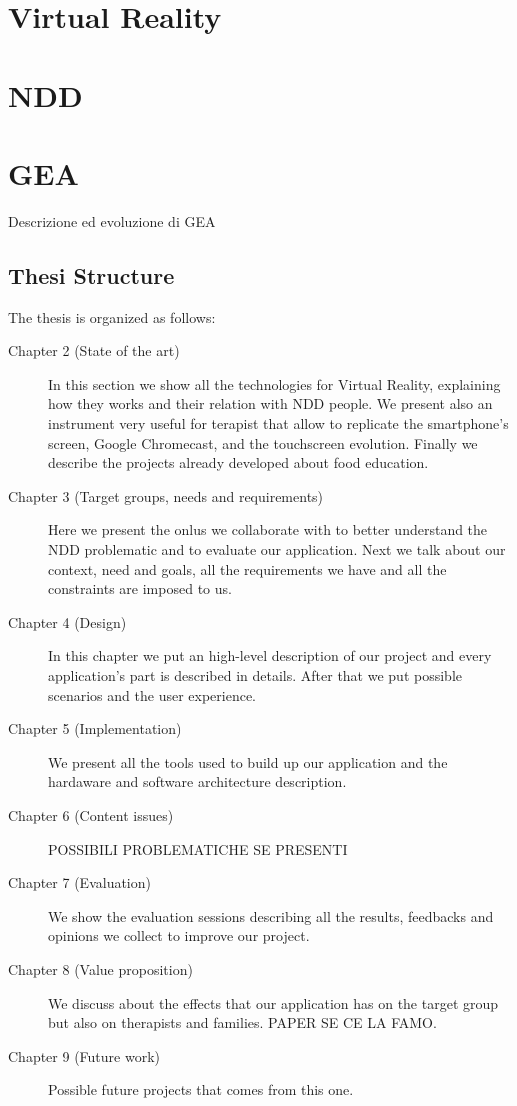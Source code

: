 \section{Virtual Reality}
\section{NDD}
\section{GEA}
Descrizione ed evoluzione di GEA
\subsection{Thesi Structure}
The thesis is organized as follows:
\begin{description}
\item[Chapter 2 (State of the art)] In this section we show all the technologies for Virtual Reality, explaining how they works and their relation with NDD people. We present also an instrument very useful for terapist that allow to replicate the smartphone's screen, Google Chromecast, and the touchscreen evolution. Finally we describe the projects already developed about food education.
\item[Chapter 3 (Target groups, needs and requirements)] Here we present the onlus we collaborate with to better understand the NDD problematic and to evaluate our application. Next we talk about our context, need and goals, all the requirements we have and all the constraints are imposed to us.
\item[Chapter 4 (Design)] In this chapter we put an high-level description of our project and every application's part is described in details. After that we put possible scenarios and the user experience. 
\item[Chapter 5 (Implementation)] We present all the tools used to build up our application and the hardaware and software architecture description.
\item[Chapter 6 (Content issues)]POSSIBILI PROBLEMATICHE SE PRESENTI
\item[Chapter 7 (Evaluation)] We show the evaluation sessions describing all the results, feedbacks and opinions we collect to improve our project.
\item[Chapter 8 (Value proposition)] We discuss about the effects that our application has on the target group but also on therapists and families. PAPER SE CE LA FAMO.
\item[Chapter 9 (Future work)] Possible future projects that comes from this one.
\end{description}
 
